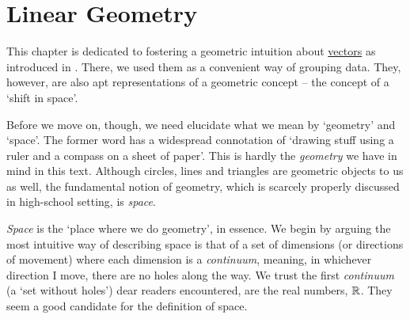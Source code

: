 \chapter{Linear Geometry}
\label{chap:linear-geometry}

This chapter is dedicated to fostering a geometric intuition about
\hyperref[def:vector]{vectors} as introduced in
. There, we used
them as a convenient way of grouping data. They, however, are also apt
representations of a geometric concept -- the concept of a `shift in space'.

Before we move on, though, we need elucidate what we mean by `geometry' and
`space'. The former word has a widespread connotation of `drawing stuff using a
ruler and a compass on a sheet of paper'. This is hardly the \emph{geometry} we
have in mind in this text. Although circles, lines and triangles are geometric
objects to us as well, the fundamental notion of geometry, which is scarcely
properly discussed in high-school setting, is \emph{space}.

\emph{Space} is the `place where we do geometry', in essence. We begin by
arguing the most intuitive way of describing space is that of a set of
dimensions (or directions of movement) where each dimension is a
\emph{continuum}, meaning, in whichever direction I move, there are no holes
along the way. We trust the first \emph{continuum} (a `set without holes') dear
readers encountered, are the real numbers, $\mathbb{R}$. They seem a good candidate for
the definition of space.

